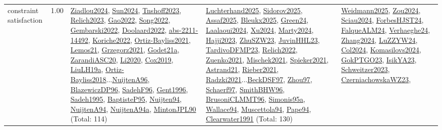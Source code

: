 {\begin{longtable}{p{3cm}r>{\raggedright\arraybackslash}p{6cm}>{\raggedright\arraybackslash}p{6cm}>{\raggedright\arraybackslash}p{8cm}}
\index{constraint satisfaction}\index{CP!constraint satisfaction}constraint satisfaction &  1.00 & \hyperref[detail:Ziadlou2024]{Ziadlou2024}, \hyperref[detail:Sun2024]{Sun2024}, \hyperref[detail:Tnshoff2023]{Tnshoff2023}, \hyperref[detail:Relich2023]{Relich2023}, \hyperref[detail:Gao2022]{Gao2022}, \hyperref[detail:Song2022]{Song2022}, \hyperref[detail:Gembarski2022]{Gembarski2022}, \hyperref[detail:Doolaard2022]{Doolaard2022}, \hyperref[detail:abs-2211-14492]{abs-2211-14492}, \hyperref[detail:Koriche2022]{Koriche2022}, \hyperref[detail:Ortiz-Bayliss2021]{Ortiz-Bayliss2021}, \hyperref[detail:Lemos21]{Lemos21}, \hyperref[detail:Grzegorz2021]{Grzegorz2021}, \hyperref[detail:Godet21a]{Godet21a}, \hyperref[detail:ZarandiASC20]{ZarandiASC20}, \hyperref[detail:Li2020]{Li2020}, \hyperref[detail:Cox2019]{Cox2019}, \hyperref[detail:LiuLH19a]{LiuLH19a}, \hyperref[detail:Ortiz-Bayliss2018]{Ortiz-Bayliss2018}...\hyperref[detail:NuijtenA96]{NuijtenA96}, \hyperref[detail:BlazewiczDP96]{BlazewiczDP96}, \hyperref[detail:SadehF96]{SadehF96}, \hyperref[detail:Gent1996]{Gent1996}, \hyperref[detail:Sadeh1995]{Sadeh1995}, \hyperref[detail:BaptisteP95]{BaptisteP95}, \hyperref[detail:Nuijten94]{Nuijten94}, \hyperref[detail:NuijtenA94]{NuijtenA94}, \hyperref[detail:NuijtenA94a]{NuijtenA94a}, \hyperref[detail:MintonJPL90]{MintonJPL90} (Total: 114) & \hyperref[detail:Luchterhand2025]{Luchterhand2025}, \hyperref[detail:Sidorov2025]{Sidorov2025}, \hyperref[detail:Assaf2025]{Assaf2025}, \hyperref[detail:Bleukx2025]{Bleukx2025}, \hyperref[detail:Green24]{Green24}, \hyperref[detail:Laalaoui2024]{Laalaoui2024}, \hyperref[detail:Xu2024]{Xu2024}, \hyperref[detail:Marty2024]{Marty2024}, \hyperref[detail:Hajji2023]{Hajji2023}, \hyperref[detail:ZhuSZW23]{ZhuSZW23}, \hyperref[detail:JuvinHHL23]{JuvinHHL23}, \hyperref[detail:TardivoDFMP23]{TardivoDFMP23}, \hyperref[detail:Relich2022]{Relich2022}, \hyperref[detail:Zuenko2021]{Zuenko2021}, \hyperref[detail:Mischek2021]{Mischek2021}, \hyperref[detail:Spieker2021]{Spieker2021}, \hyperref[detail:Astrand21]{Astrand21}, \hyperref[detail:Rieber2021]{Rieber2021}, \hyperref[detail:Radzki2021]{Radzki2021}...\hyperref[detail:BeckDSF97]{BeckDSF97}, \hyperref[detail:Zhou97]{Zhou97}, \hyperref[detail:Schaerf97]{Schaerf97}, \hyperref[detail:SmithBHW96]{SmithBHW96}, \hyperref[detail:BrusoniCLMMT96]{BrusoniCLMMT96}, \hyperref[detail:Simonis95a]{Simonis95a}, \hyperref[detail:Wallace94]{Wallace94}, \hyperref[detail:Muscettola94]{Muscettola94}, \hyperref[detail:Pape94]{Pape94}, \hyperref[detail:Clearwater1991]{Clearwater1991} (Total: 130) & \hyperref[detail:Weidmann2025]{Weidmann2025}, \hyperref[detail:Zou2024]{Zou2024}, \hyperref[detail:Sciau2024]{Sciau2024}, \hyperref[detail:ForbesHJST24]{ForbesHJST24}, \hyperref[detail:FalqueALM24]{FalqueALM24}, \hyperref[detail:Verhaeghe24]{Verhaeghe24}, \hyperref[detail:Zhang2024]{Zhang2024}, \hyperref[detail:LuZZYW24]{LuZZYW24}, \hyperref[detail:Col2024]{Col2024}, \hyperref[detail:Komasilovs2024]{Komasilovs2024}, \hyperref[detail:GokPTGO23]{GokPTGO23}, \hyperref[detail:IsikYA23]{IsikYA23}, \hyperref[detail:Schweitzer2023]{Schweitzer2023}, \hyperref[detail:CzerniachowskaWZ23]{CzerniachowskaWZ23}, 
\end{longtable}}
